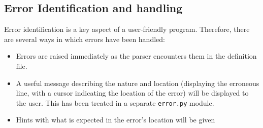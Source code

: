 \documentclass[12pt]{article}
\begin{document}
\subsection{Error Identification and handling}

Error identification is a key aspect of a user-friendly program. Therefore, there are several ways in which errors have been handled:
\begin{itemize}
\item Errors are raised immediately as the parser encounters them in the definition file.
\item A useful message describing the nature and location (displaying the erroneous line, with a cursor indicating the location of the error) will be displayed to the user. This has been treated in a separate \texttt{error.py} module.
\item Hints with what is expected in the error's location will be given
\end{itemize}
\hline
\end{document}
